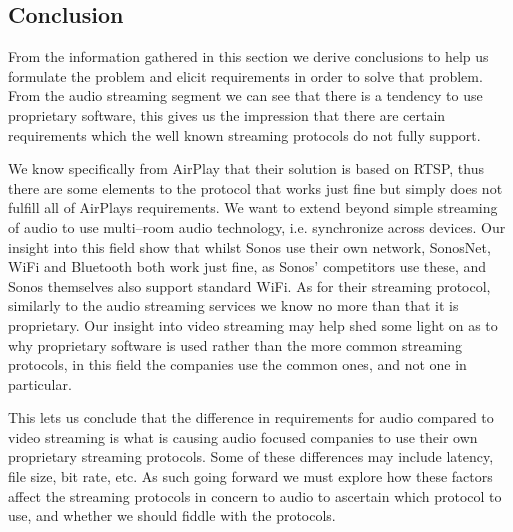 

\subsection{Conclusion}
From the information gathered in this section we derive conclusions to help us formulate the problem and elicit requirements in order to solve that problem.
From the audio streaming segment we can see that there is a tendency to use proprietary software, this gives us the impression that there are certain requirements which the well known streaming protocols do not fully support. 

We know specifically from AirPlay that their solution is based on \ac{RTSP}, thus there are some elements to the protocol that works just fine but simply does not fulfill all of AirPlays requirements.
We want to extend beyond simple streaming of audio to use multi--room audio technology, i.e. synchronize across devices. 
Our insight into this field show that whilst Sonos use their own network, SonosNet, WiFi and Bluetooth both work just fine, as Sonos' competitors use these, and Sonos themselves also support standard WiFi.
As for their streaming protocol, similarly to the audio streaming services we know no more than that it is proprietary.
Our insight into video streaming may help shed some light on as to why proprietary software is used rather than the more common streaming protocols, in this field the companies use the common ones, and not one in particular.

This lets us conclude that the difference in requirements for audio compared to video streaming is what is causing audio focused companies to use their own proprietary streaming protocols.
Some of these differences may include latency, file size, bit rate, etc.
As such going forward we must explore how these factors affect the streaming protocols in concern to audio to ascertain which protocol to use, and whether we should fiddle with the protocols.





